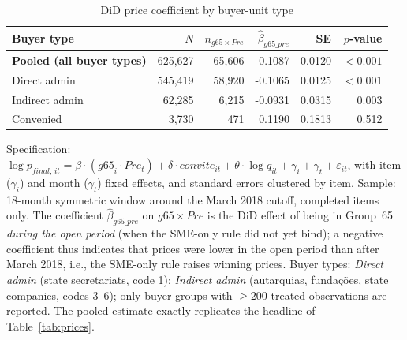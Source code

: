 \begin{table}[!htbp]
\centering
\small
\caption{DiD price coefficient by buyer-unit type}
\label{tab:v3_buyer_het}
\begin{threeparttable}
\begin{tabular}{lrrrrr}
\toprule
Buyer type & $N$ & $n_{g65 \times Pre}$ & $\hat\beta_{g65\_pre}$ & SE & $p$-value \\
\midrule
\textbf{Pooled (all buyer types)} & 625,627 & 65,606 & -0.1087 & 0.0120 & $<0.001$ \\
\midrule
\quad Direct admin & 545,419 & 58,920 & -0.1065 & 0.0125 & $<0.001$ \\
\quad Indirect admin & 62,285 & 6,215 & -0.0931 & 0.0315 & 0.003 \\
\quad Convenied & 3,730 & 471 & 0.1190 & 0.1813 & 0.512 \\
\bottomrule
\end{tabular}
\begin{tablenotes}\footnotesize
\item Specification: $\log p_{\mathit{final},\,it} = \beta \cdot
(\mathit{g65}_i \cdot \mathit{Pre}_t) + \delta \cdot \mathit{convite}_{it}
+ \theta \cdot \log q_{it} + \gamma_i + \gamma_t + \varepsilon_{it}$,
with item ($\gamma_i$) and month ($\gamma_t$) fixed effects, and
standard errors clustered by item. Sample: 18-month symmetric
window around the March 2018 cutoff, completed items only. The
coefficient $\hat\beta_{g65\_pre}$ on $g65 \times Pre$ is the
DiD effect of being in Group~65 \emph{during the open period}
(when the SME-only rule did not yet bind); a negative coefficient
thus indicates that prices were lower in the open period than
after March 2018, i.e., the SME-only rule raises winning prices.
Buyer types: \textit{Direct admin} (state secretariats, code 1);
\textit{Indirect admin} (autarquias, funda\c{c}\~oes, state companies,
codes 3--6); only buyer groups with $\geq 200$ treated observations
are reported. The pooled estimate exactly replicates the headline of
Table~\ref{tab:prices}.
\end{tablenotes}
\end{threeparttable}
\end{table}
